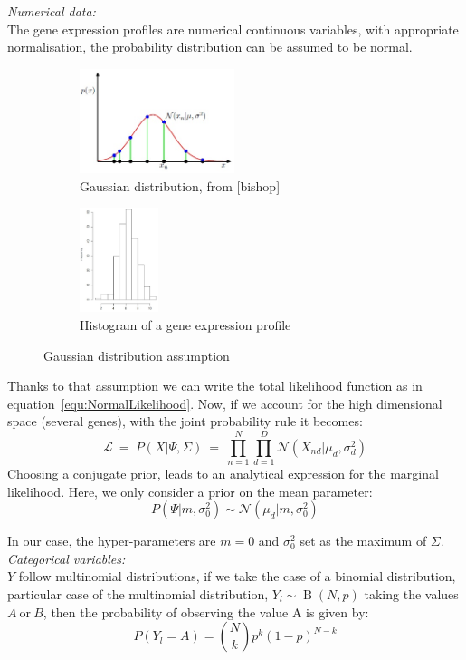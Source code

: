 \documentclass[twocolumn,12pt]{article}
\begin{document}
\emph{Numerical data:}\\
The gene expression profiles are numerical continuous variables, with appropriate normalisation, the probability distribution can be assumed to be normal.
\begin{figure}[!]
    \centering
    \begin{subfigure}[t]{0.25\textwidth}
        \centering
        \includegraphics[height=1.2in]{img/gaussDist.jpg}
        \caption{Gaussian distribution, from [bishop]}
    \end{subfigure}%
    \begin{subfigure}[t]{0.25\textwidth}
        \centering
        \includegraphics[height=1.2in]{img/distVar.jpg}
        \caption{Histogram of a gene expression profile}
    \end{subfigure}
    \caption{Gaussian distribution assumption}
\end{figure}
Thanks to that assumption we can write the total likelihood function as in equation~\ref{equ:NormalLikelihood}.
Now, if we account for the high dimensional space (several genes), with the joint probability rule it becomes:
\begin{equation}
    \mathcal{L}\ =\ P(X|\Psi,\Sigma)\ =\ \prod_{n=1}^{N}\prod_{d=1}^{D}\mathcal{N}(X_{nd}|\mu_d,\sigma_d^2)
\end{equation}
Choosing a conjugate prior, leads to  an analytical expression for the marginal likelihood.
Here, we only consider a prior on the mean parameter:\\
$$P(\Psi|m,\sigma_0^2)\sim\mathcal{N}(\mu_d|m,\sigma_0^2)$$


In our case, the hyper-parameters are $m=0$ and $\sigma_0^2$ set as the maximum of $\Sigma$.\\

\emph{Categorical variables:}\\
$Y$ follow multinomial distributions, if we take the case of a binomial distribution, particular case of the multinomial distribution, $Y_l\sim\operatorname{B} \left({N, p}\right)$ taking the values $A\ \text{or}\ B$, then the probability of observing the value A is given by:\\
$$P(Y_l=A) = {N\choose k}p^k(1-p)^{N-k}$$
\end{document}
